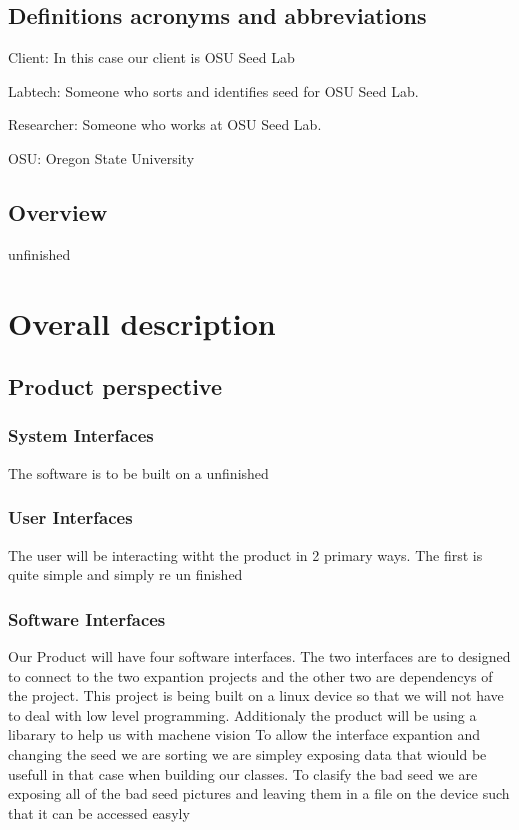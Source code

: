 \documentclass[onecolumn, draftclsnofoot,10pt, compsoc]{IEEEtran}
\begin{document}
\subsection{Definitions acronyms and abbreviations}
Client: In this case our client is OSU Seed Lab

Labtech: Someone who sorts and identifies seed for OSU Seed Lab.

Researcher: Someone who works at OSU Seed Lab.

OSU: Oregon State University

\subsection{Overview}
unfinished

\section{Overall description}

\subsection{Product perspective}

\subsubsection{System Interfaces}
The software is to be built on a
unfinished
\subsubsection{User Interfaces}
The user will be interacting witht the product in 2 primary ways.
The first is quite simple and simply re
un finished
\subsubsection{Software Interfaces}
Our Product will have four software interfaces.
The two interfaces are to designed to connect to the two expantion projects and the other two are dependencys of the project.
This project is being built on a linux device so that we will not have to deal with low level programming.
Additionaly the product will be using a libarary to help us with machene vision
To allow the interface expantion and changing the seed we are sorting we are simpley exposing data that wiould be usefull in that case when building our classes.
To clasify the bad seed we are exposing all of the bad seed pictures and leaving them in a file on the device such that it can be accessed easyly
\end{document}

